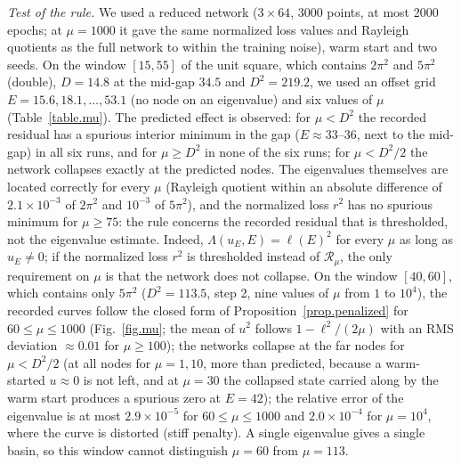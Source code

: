 \documentclass[10pt]{amsart}
\newenvironment{revblock}{\color{blue}}{}
\theoremstyle{definition}
\theoremstyle{remark}
\theoremstyle{plain}
\begin{document}
\begin{revblock}
\emph{Test of the rule.} We used a reduced network ($3\times64$, 3000 points, at most 2000 epochs;
at $\mu=1000$ it gave the same normalized loss values and Rayleigh quotients as the full network to
within the training noise), warm start and two seeds. On the window $[15,55]$ of the unit square,
which contains $2\pi^2$ and $5\pi^2$ (double), $D=14.8$ at the mid-gap $34.5$ and $D^2=219.2$, we used an
offset grid $E=15.6,18.1,\dots,53.1$ (no node on an eigenvalue) and six values of $\mu$
(Table~\ref{table.mu}). The predicted effect is observed: for $\mu<D^2$ the recorded residual has a
spurious interior minimum in the gap ($E\approx33$--$36$, next to the mid-gap) in all six runs, and for
$\mu\ge D^2$ in none of the six runs; for $\mu<D^2/2$ the network collapses exactly at the predicted
nodes. The eigenvalues themselves are located correctly for every $\mu$ (Rayleigh quotient within an
absolute difference of $2.1\times10^{-3}$ of $2\pi^2$ and $10^{-3}$ of $5\pi^2$), and the normalized loss $r^2$ has no spurious
minimum for $\mu\ge75$: the rule concerns the recorded residual that is thresholded, not the
eigenvalue estimate. Indeed, $\Lambda(u_E,E)=\ell(E)^2$ for every $\mu$ as long as $u_E\ne0$; if the
normalized loss $r^2$ is thresholded instead of $\mathcal R_\mu$, the only requirement on $\mu$ is that
the network does not collapse. On the window $[40,60]$, which contains only $5\pi^2$ ($D^2=113.5$, step 2, nine
values of $\mu$ from $1$ to $10^4$), the recorded curves follow the closed form of
Proposition~\ref{prop.penalized} for $60\le\mu\le1000$ (Fig.~\ref{fig.mu}; the mean of $u^2$ follows
$1-\ell^2/(2\mu)$ with an RMS deviation $\approx0.01$ for $\mu\ge100$); the networks collapse at the
far nodes for $\mu<D^2/2$ (at all nodes for $\mu=1,10$, more than predicted, because a warm-started
$u\approx0$ is not left, and at $\mu=30$ the collapsed state carried along by the warm start produces
a spurious zero at $E=42$); the relative error of the eigenvalue is at most $2.9\times10^{-5}$ for
$60\le\mu\le1000$ and $2.0\times10^{-4}$ for $\mu=10^4$, where the curve is distorted (stiff penalty).
A single eigenvalue gives a single basin, so this window cannot distinguish $\mu=60$ from $\mu=113$.


\end{revblock}
\end{document}
